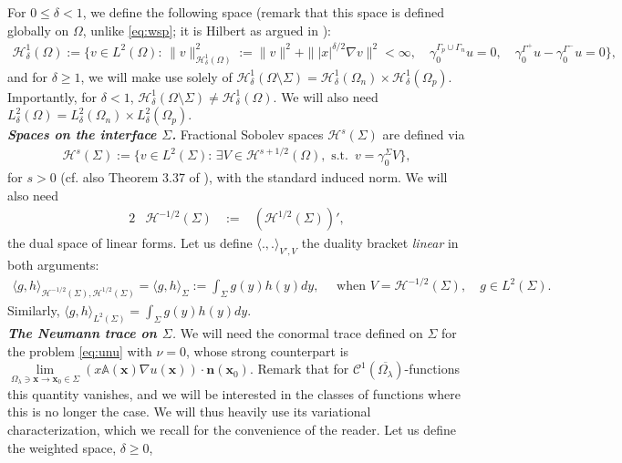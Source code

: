\documentclass[report]{elsarticle}
\numberwithin{theorem}{section}
\renewcommand{\vec}[1]{\mathbf{#1}}
\begin{document}
For $0\leq\delta<1$, we define the following space (remark that this space is defined globally on $\Omega$, unlike \eqref{eq:wsp}; it is Hilbert as argued in \cite[Theorem 1.11]{kufner1984define}): 
\begin{align*}
	\mathcal{H}^1_{\delta}(\Omega):=\{v\in L^2(\Omega): \, \|v\|_{\mathcal{H}^1_{\delta}(\Omega)}^2:=\|v\|^2+\||x|^{\delta/2}\nabla v\|^2<\infty,\quad \gamma_0^{\Gamma_p\cup\Gamma_n}u=0,  \quad \gamma_0^{\Gamma^+}u-\gamma_0^{\Gamma^-}u=0\},
\end{align*}
and for $\delta\geq 1$, we will make use solely of 
$\mathcal{H}^1_{\delta}(\Omega\setminus\Sigma)=\mathcal{H}^1_{\delta}(\Omega_{n})\times \mathcal{H}^1_{\delta}(\Omega_{p}).$  Importantly, for $\delta<1$,  $\mathcal{H}^1_{\delta}(\Omega\setminus\Sigma)\neq \mathcal{H}^1_{\delta}(\Omega)$. We will also need $
L^2_{\delta}(\Omega)=L^2_{\delta}(\Omega_n)\times L^2_{\delta}(\Omega_p).$\\
%
%
\textit{\textbf{Spaces on the interface $\Sigma$. }} 
Fractional Sobolev spaces $\mathcal{H}^s(\Sigma)$  are defined via 
\begin{align*}
	\mathcal{H}^s(\Sigma):=\{v\in L^2(\Sigma): \, \exists V\in \mathcal{H}^{s+1/2}(\Omega), \text{ s.t. }\, v=\gamma_0^{\Sigma}V\},
\end{align*}
for $s>0$ (cf. also Theorem 3.37 of \cite{mclean}), with the standard induced norm. 
We will also need
\begin{alignat*}{2}
	&\mathcal{H}^{-1/2}(\Sigma) 
	&\;:=\; &\left( \mathcal{H}^{1/2}(\Sigma) \right)',
\end{alignat*}
the dual space of linear forms. Let us define $\langle.,.\rangle_{V',V}$ the duality bracket \textit{linear} in both arguments:
\begin{align*}
	\langle g, h\rangle_{\mathcal{H}^{-1/2}(\Sigma), \mathcal{H}^{1/2}(\Sigma)}=\langle g, h\rangle_{\Sigma}:=\int_{\Sigma}g(y)h(y)dy, \quad \text{ when  }V=\mathcal{H}^{-1/2}(\Sigma),\quad g\in L^2(\Sigma).
\end{align*}
Similarly, $\langle g, h\rangle_{L^2(\Sigma)}=\int_{\Sigma}g(y)h(y)dy$.\\ 
%
\textit{\textbf{The Neumann trace on $\Sigma$}. }
We will need the conormal trace defined on $\Sigma$ for the problem \eqref{eq:unu} with $\nu=0$, whose strong counterpart is $\lim\limits_{\Omega_{\lambda}\ni \vec{x}\rightarrow \vec{x}_0\in \Sigma}({x}\mathbb{A}(\vec{x})\nabla u(\vec{x}))\cdot \vec{n}(\vec{x}_0)$. Remark that for $\mathcal{C}^1(\overline{\Omega_{\lambda}})$-functions this quantity vanishes, and we will be interested in the classes of functions where this is no longer the case. We will thus heavily use its variational characterization, which we recall for the convenience of the reader. Let us define the weighted space, $\delta\geq 0$, 
\end{document}

